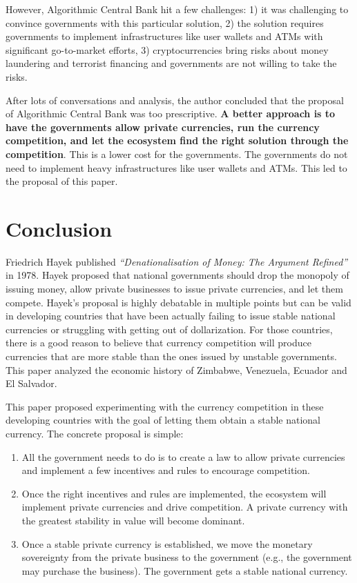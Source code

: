 \documentclass[dvipdfmx,a4paper]{article}
\begin{document}
However, Algorithmic Central Bank hit a few challenges: 1) it was challenging to convince governments with this particular solution, 2) the solution requires governments to implement infrastructures like user wallets and ATMs with significant go-to-market efforts, 3) cryptocurrencies bring risks about money laundering and terrorist financing and governments are not willing to take the risks.

After lots of conversations and analysis, the author concluded that the proposal of Algorithmic Central Bank was too prescriptive. \textbf{A better approach is to have the governments allow private currencies, run the currency competition, and let the ecosystem find the right solution through the competition}. This is a lower cost for the governments. The governments do not need to implement heavy infrastructures like user wallets and ATMs. This led to the proposal of this paper.

\section{Conclusion}

Friedrich Hayek published \textit{``Denationalisation of Money: The Argument Refined''} in 1978. Hayek proposed that national governments should drop the monopoly of issuing money, allow private businesses to issue private currencies, and let them compete. Hayek's proposal is highly debatable in multiple points but can be valid in developing countries that have been actually failing to issue stable national currencies or struggling with getting out of dollarization. For those countries, there is a good reason to believe that currency competition will produce currencies that are more stable than the ones issued by unstable governments. This paper analyzed the economic history of Zimbabwe, Venezuela, Ecuador and El Salvador.

This paper proposed experimenting with the currency competition in these developing countries with the goal of letting them obtain a stable national currency. The concrete proposal is simple:

\begin{enumerate}
\item All the government needs to do is to create a law to allow private currencies and implement a few incentives and rules to encourage competition.
\item Once the right incentives and rules are implemented, the ecosystem will implement private currencies and drive competition. A private currency with the greatest stability in value will become dominant.
\item Once a stable private currency is established, we move the monetary sovereignty from the private business to the government (e.g., the government may purchase the business). The government gets a stable national currency.
\end{enumerate}



\end{document}
